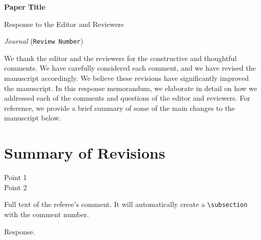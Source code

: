 \documentclass[12pt]{article}
\begin{document}
\begin{center}
    {\Large\bf Paper Title}
    
    \vspace{1em}

    {\large Response to the Editor and Reviewers}

    \vspace{.5em}

    \emph{Journal} (\texttt{Review Number})
    
    \vspace{1em}
\end{center}

\noindent We thank the editor and the reviewers for the constructive and thoughtful comments. We have carefully considered each comment, and we have revised the manuscript accordingly. 
We believe these revisions have significantly improved the manuscript. In this response memorandum, we elaborate in detail on how we addressed each of the comments and questions of the editor and reviewers. For reference, we provide a brief summary of some of the main changes to the manuscript below.

\section{Summary of Revisions}

\begin{description}
  \item[Point 1] \lipsum[1]
  \item[Point 2] \lipsum[1]
\end{description}

\vspace*{\bigskipamount}


\begin{refcomment}
  Full text of the referee's comment. It will automatically create a \texttt{\textbackslash subsection} with the comment number.
  
  \lipsum[1-2]
\end{refcomment}

Response.
\lipsum[2]
\end{document}
